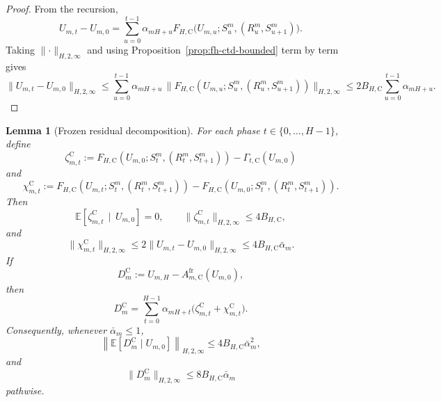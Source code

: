 \documentclass{article}
\newtheorem{lemma}[theorem]{Lemma}
\begin{document}
\begin{proof}
From the recursion,
\begin{equation}
U_{m,t}-U_{m,0} = \sum_{u=0}^{t-1} \alpha_{mH+u} F_{H,\mathrm C}\bigl(U_{m,u};S_u^m,(R_u^m,S_{u+1}^m)\bigr).
\end{equation}
Taking $\lVert \cdot \rVert_{H,2,\infty}$ and using Proposition~\ref{prop:fh-ctd-bounded} term by term gives
\begin{equation}
\lVert U_{m,t}-U_{m,0} \rVert_{H,2,\infty} \le \sum_{u=0}^{t-1}\alpha_{mH+u}\, \lVert F_{H,\mathrm C}(U_{m,u};S_u^m,(R_u^m,S_{u+1}^m)) \rVert_{H,2,\infty} \le 2B_{H,\mathrm C}\sum_{u=0}^{t-1}\alpha_{mH+u}.
\end{equation}
\end{proof}

\begin{lemma}[Frozen residual decomposition]
\label{lem:fh-ctd-bias}
For each phase $t \in \{0,\dots,H-1\}$, define
\begin{equation}
\zeta_{m,t}^{\mathrm C} := F_{H,\mathrm C}(U_{m,0};S_t^m,(R_t^m,S_{t+1}^m)) - \Gamma_{t,\mathrm C}(U_{m,0})
\end{equation}
and
\begin{equation}
\chi_{m,t}^{\mathrm C} := F_{H,\mathrm C}(U_{m,t};S_t^m,(R_t^m,S_{t+1}^m)) - F_{H,\mathrm C}(U_{m,0};S_t^m,(R_t^m,S_{t+1}^m)).
\end{equation}
Then
\begin{equation}
\mathbb E\left[\zeta_{m,t}^{\mathrm C}\,\mid\,U_{m,0}\right]=0, \qquad \lVert \zeta_{m,t}^{\mathrm C} \rVert_{H,2,\infty} \le 4B_{H,\mathrm C},
\end{equation}
and
\begin{equation}
\lVert \chi_{m,t}^{\mathrm C} \rVert_{H,2,\infty} \le 2\lVert U_{m,t}-U_{m,0} \rVert_{H,2,\infty} \le 4B_{H,\mathrm C}\bar\alpha_m.
\end{equation}
If
\begin{equation}
D_m^{\mathrm C}:=U_{m,H}-A_{m,\mathrm C}^{\mathrm{fr}}(U_{m,0}),
\end{equation}
then
\begin{equation}
D_m^{\mathrm C}=\sum_{t=0}^{H-1}\alpha_{mH+t}\bigl(\zeta_{m,t}^{\mathrm C}+\chi_{m,t}^{\mathrm C}\bigr).
\end{equation}
Consequently, whenever $\bar\alpha_m\le1$,
\begin{equation}
\left\lVert\mathbb E\left[D_m^{\mathrm C}\mid U_{m,0}\right]\right\rVert_{H,2,\infty}\le4B_{H,\mathrm C}\bar\alpha_m^2,
\end{equation}
and
\begin{equation}
\lVert D_m^{\mathrm C}\rVert_{H,2,\infty}\le8B_{H,\mathrm C}\bar\alpha_m
\end{equation}
pathwise.
\end{lemma}
\end{document}
